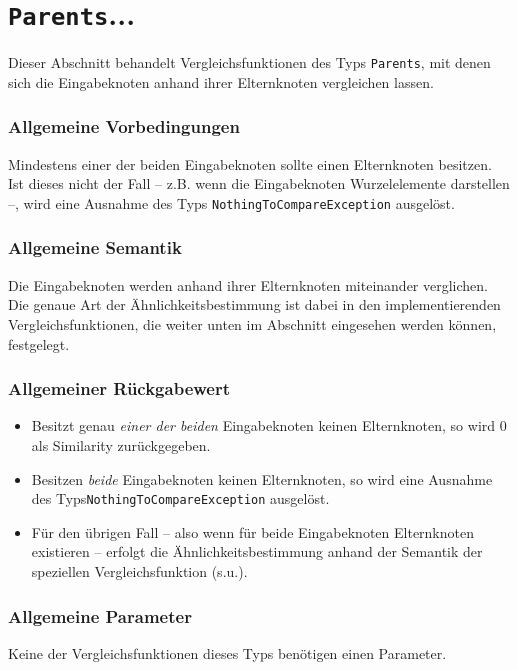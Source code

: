 %
%

\section{\texttt{Parents}...}
\label{strct:spec:parents}
Dieser Abschnitt behandelt Vergleichsfunktionen des Typs \texttt{Parents}, mit denen sich die Eingabeknoten anhand ihrer Elternknoten vergleichen lassen.

\subsubsection*{Allgemeine Vorbedingungen}
Mindestens einer der beiden Eingabeknoten sollte einen Elternknoten besitzen.\\
Ist dieses nicht der Fall -- z.B. wenn die Eingabeknoten Wurzelelemente darstellen --, wird eine Ausnahme des Typs \texttt{NothingToCompareException} ausgelöst.

\subsubsection*{Allgemeine Semantik}
Die Eingabeknoten werden anhand ihrer Elternknoten miteinander verglichen. Die genaue Art der Ähnlichkeitsbestimmung ist dabei in den implementierenden Vergleichsfunktionen, die weiter unten im Abschnitt eingesehen werden können, festgelegt.

\subsubsection*{Allgemeiner Rückgabewert}
\begin{itemize}
	\item Besitzt genau \emph{einer der beiden} Eingabeknoten keinen Elternknoten, so wird $0$ als Similarity zurückgegeben.
	\item Besitzen \emph{beide} Eingabeknoten keinen Elternknoten, so wird eine Ausnahme des Typs\mylinebreak\texttt{NothingToCompareException} ausgelöst.
	\item Für den übrigen Fall -- also wenn für beide Eingabeknoten Elternknoten existieren -- erfolgt die Ähnlichkeitsbestimmung anhand der Semantik der speziellen Vergleichsfunktion (s.u.).
\end{itemize}

\subsubsection*{Allgemeine Parameter}
Keine der Vergleichsfunktionen dieses Typs benötigen einen Parameter.



